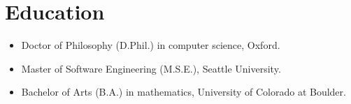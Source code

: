 \section*{Education}
\vspace{-2mm}

\begin{itemize}
    \item Doctor of Philosophy (D.Phil.) in computer science, Oxford.\vspace{-1mm}
	\item Master of Software Engineering (M.S.E.), Seattle University.\vspace{-1mm}
	\item Bachelor of Arts (B.A.) in mathematics, University of Colorado at Boulder.
\end{itemize}

